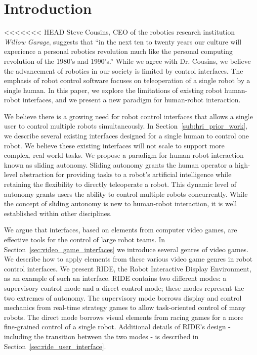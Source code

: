 \chapter{Introduction}
<<<<<<< HEAD
Steve Cousins, CEO of the robotics research institution \emph{Willow Garage}, suggests that ``in the next ten to twenty years our culture will experience a personal robotics revolution much like the personal computing revolution of the 1980's and 1990's.'' \cite{Cousins} While we agree with Dr. Cousins, we believe the advancement of robotics in our society is limited by control interfaces. The emphasis of robot control software focuses on teleoperation of a single robot by a single human. In this paper, we explore the limitations of existing robot human-robot interfaces, and we present a new paradigm for human-robot interaction.

We believe there is a growing need for robot control interfaces that allows a single user to control multiple robots simultaneously. In Section~\ref{sub:hri_prior_work}, we describe several existing interfaces designed for a single human to control one robot. We believe these existing interfaces will not scale to support more complex, real-world tasks. We propose a paradigm for human-robot interaction known as sliding autonomy. Sliding autonomy grants the human operator a high-level abstraction for providing tasks to a robot's artificial intelligence while retaining the flexibility to directly teleoperate a robot. This dynamic level of autonomy grants users the ability to control multiple robots concurrently. While the concept of sliding autonomy is new to human-robot interaction, it is well established within other disciplines.

We argue that interfaces, based on elements from computer video games, are effective tools for the control of large robot teams. In Section~\ref{sec:video_game_interfaces} we introduce several genres of video games. We describe how to apply elements from these various video game genres in robot control interfaces. We present RIDE, the Robot Interactive Display Environment, as an example of such an interface. RIDE contains two different modes: a supervisory control mode and a direct control mode; these modes represent the two extremes of autonomy. The supervisory mode borrows display and control mechanics from real-time strategy games to allow task-oriented control of many robots. The direct mode borrows visual elements from racing games for a more fine-grained control of a single robot. Additional details of RIDE's design - including the transition between the two modes - is described in Section~\ref{sec:ride_user_interface}.

